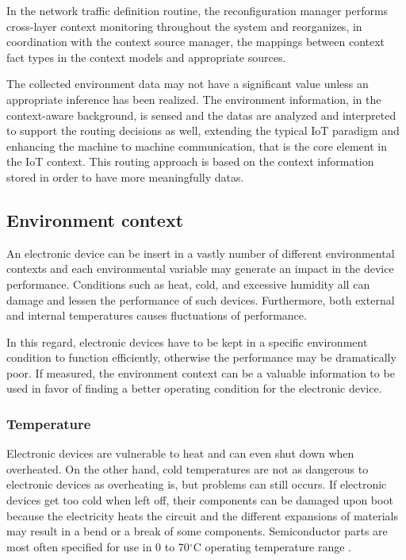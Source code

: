 In the network traffic definition routine, the reconfiguration manager performs cross-layer context monitoring throughout the system and reorganizes, in coordination with the context source manager, the mappings between context fact types in the context models and appropriate sources.

The collected environment data may not have a significant value unless an appropriate inference has been realized. The environment information, in the context-aware background, is sensed and the datas are analyzed and interpreted to support the routing decisions as well, extending the typical IoT paradigm and enhancing the machine to machine communication, that is the core element in the IoT context. This routing approach is based on the context information stored in order to have more meaningfully datas.

\subsection{Environment context}

An electronic device can be insert in a vastly number of different environmental contexts and each environmental variable may generate an impact in the device performance. Conditions such as heat, cold, and excessive humidity all can damage and lessen the performance of such devices. Furthermore, both external and internal temperatures causes fluctuations of performance.

In this regard, electronic devices have to be kept in a specific environment condition to function efficiently, otherwise the performance may be dramatically poor. If measured, the environment context can be a valuable information to be used in favor of finding a better operating condition for the electronic device.

\subsubsection{Temperature}
Electronic devices are vulnerable to heat and can even shut down when overheated. On the other hand, cold temperatures are not as dangerous to electronic devices as overheating is, but problems can still occurs. If electronic devices get too cold when left off, their components can be damaged upon boot because the electricity heats the circuit and the different expansions of materials may result in a bend or a break of some components. Semiconductor parts are most often specified for use in 0 to 70$^{\circ}$C operating temperature range \cite{Mishra2004}.

